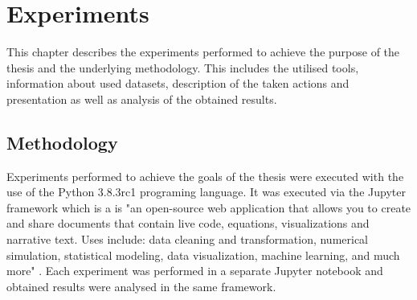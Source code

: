 \documentclass[a4paper,twoside,12pt]{book}
\begin{document}


\chapter{Experiments}


This chapter describes the experiments performed to achieve the purpose of the thesis
and the underlying methodology. This includes the utilised tools, information about used datasets,
description of the taken actions and presentation as well as analysis of the obtained results. 


\section{Methodology}

Experiments performed to achieve the goals of the thesis were executed with the use of 
the Python 3.8.3rc1 programing language. It was executed via the Jupyter framework which is
a is "an open-source web application that allows you to create and share documents that 
contain live code, equations, visualizations and narrative text. Uses include: data cleaning 
and transformation, numerical simulation, statistical modeling, data visualization, machine 
learning, and much more" \cite{bib:jupyter}. Each experiment was performed in a separate
Jupyter notebook and obtained results were analysed in the same framework. 
\end{document}
